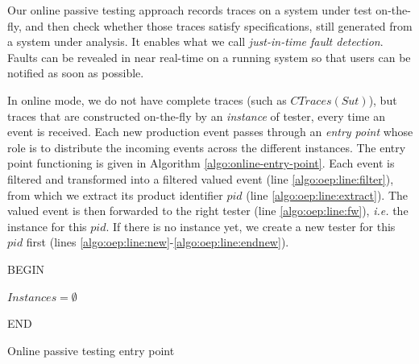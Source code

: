 Our online passive testing approach records traces on a system
under test on-the-fly, and then check whether those traces
satisfy specifications, still generated from a system under
analysis. It enables what we call \emph{just-in-time fault
detection}. Faults can be revealed in near real-time on a running
system so that users can be notified as soon as possible.

In online mode, we do not have complete traces (such as
$CTraces({Sut})$), but traces that are constructed on-the-fly by
an \emph{instance} of tester, every time an event is received.
Each new production event passes through an \emph{entry point}
whose role is to distribute the incoming events across the
different instances. The entry point functioning is given in
Algorithm \ref{algo:online-entry-point}. Each event is filtered
and transformed into a filtered valued event (line
\ref{algo:oep:line:filter}), from which we extract its product
identifier $pid$ (line \ref{algo:oep:line:extract}).  The valued
event is then forwarded to the right tester (line
\ref{algo:oep:line:fw}), \emph{i.e.} the instance for this $pid$.
If there is no instance yet, we create a new tester for this
$pid$ first (lines
\ref{algo:oep:line:new}-\ref{algo:oep:line:endnew}).


\begin{algorithm}[h]

    \Input{}

    \BlankLine

    BEGIN\;

    $Instances = \emptyset$\;


    END\;

    \caption{Online passive testing entry point}
    \label{algo:online-entry-point}
\end{algorithm}

